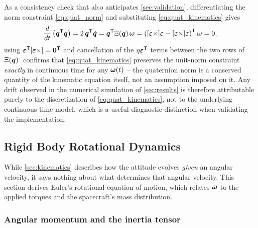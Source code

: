 As a consistency check that also anticipates \cref{sec:validation}, differentiating the norm constraint \cref{eq:quat_norm} and substituting \cref{eq:quat_kinematics} gives
\begin{equation}
    \frac{d}{dt}\left(\bm{q}^{\mathsf{T}}\bm{q}\right) = 2\,\bm{q}^{\mathsf{T}}\dot{\bm{q}} = \bm{q}^{\mathsf{T}}\Xi(\bm{q})\,\bm{\omega} = \left([\bm{\varepsilon}\times]\bm{\varepsilon}-[\bm{\varepsilon}\times]\bm{\varepsilon}\right)^{\mathsf{T}}\bm{\omega} = 0,
    \label{eq:norm_conservation}
\end{equation}
using $\bm{\varepsilon}^{\mathsf{T}}[\bm{\varepsilon}\times]=\bm{0}^{\mathsf{T}}$ and cancellation of the $\eta\bm{\varepsilon}^{\mathsf{T}}$ terms between the two rows of $\Xi(\bm{q})$.  confirms that \cref{eq:quat_kinematics} preserves the unit-norm constraint \emph{exactly} in continuous time for any $\bm{\omega}(t)$ -- the quaternion norm is a conserved quantity of the kinematic equation itself, not an assumption imposed on it. Any drift observed in the numerical simulation of \cref{sec:results} is therefore attributable purely to the discretization of \cref{eq:quat_kinematics}, not to the underlying continuous-time model, which is a useful diagnostic distinction when validating the implementation.

\subsection{Rigid Body Rotational Dynamics}
\label{sec:dynamics}

While \cref{sec:kinematics} describes how the attitude evolves \emph{given} an angular velocity, it says nothing about what determines that angular velocity. This section derives Euler's rotational equation of motion, which relates $\dot{\bm{\omega}}$ to the applied torques and the spacecraft's mass distribution.

\subsubsection{Angular momentum and the inertia tensor}

